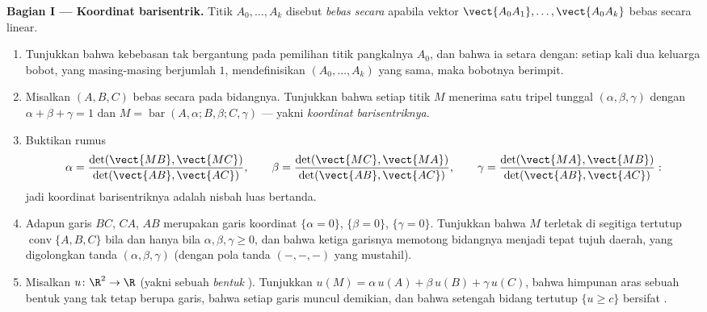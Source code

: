 \begin{problem}
\medskip
\noindent\textbf{Bagian I --- Koordinat barisentrik.} Titik
$A_0, \dots, A_k$ disebut \emph{bebas secara } apabila
vektor $\vect{A_0A_1}, \dots, \vect{A_0A_k}$ bebas
secara linear.
\begin{enumerate}
  \item Tunjukkan bahwa kebebasan  tak bergantung pada
        pemilihan titik pangkalnya $A_0$, dan bahwa ia
        setara dengan: setiap kali dua keluarga bobot, yang masing-masing
        berjumlah $1$, mendefinisikan  $(A_0,
        \dots, A_k)$ yang sama, maka bobotnya berimpit.
  \item Misalkan $(A, B, C)$ bebas secara  pada bidangnya.
        Tunjukkan bahwa setiap titik $M$ menerima satu tripel tunggal
        $(\alpha, \beta, \gamma)$ dengan $\alpha + \beta +
        \gamma = 1$ dan $M = \operatorname{bar}(A, \alpha; B,
        \beta; C, \gamma)$ --- yakni \emph{koordinat
        barisentriknya}.
  \item Buktikan rumus 
        \[
        \alpha = \frac{\det(\vect{MB},
        \vect{MC})}{\det(\vect{AB}, \vect{AC})},
        \qquad
        \beta = \frac{\det(\vect{MC},
        \vect{MA})}{\det(\vect{AB}, \vect{AC})},
        \qquad
        \gamma = \frac{\det(\vect{MA},
        \vect{MB})}{\det(\vect{AB}, \vect{AC})} :
        \]
        jadi koordinat barisentriknya adalah nisbah luas bertanda.
  \item Adapun garis $BC$, $CA$, $AB$ merupakan garis koordinat
        $\{\alpha = 0\}$, $\{\beta = 0\}$, $\{\gamma = 0\}$.
        Tunjukkan bahwa $M$ terletak di segitiga tertutup
        $\operatorname{conv}\{A, B, C\}$ bila dan hanya bila $\alpha, \beta,
        \gamma \geq 0$, dan bahwa ketiga garisnya memotong bidangnya
        menjadi tepat tujuh daerah, yang digolongkan tanda
        $(\alpha, \beta, \gamma)$ (dengan pola tanda $(-, -,
        -)$ yang mustahil).
  \item Misalkan $u \colon \R^2 \to \R$  (yakni sebuah
        \emph{bentuk }). Tunjukkan $u(M) = \alpha\,u(A) +
        \beta\,u(B) + \gamma\,u(C)$, bahwa himpunan aras sebuah
        bentuk  yang tak tetap berupa garis, bahwa setiap garis
        muncul demikian, dan bahwa setengah bidang tertutup $\{u
        \geq c\}$ bersifat .
\end{enumerate}


\end{problem}
